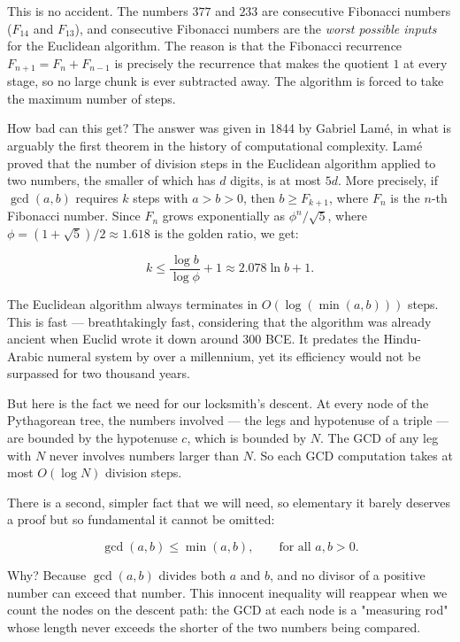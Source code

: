 This is no accident. The numbers $377$ and $233$ are consecutive Fibonacci numbers ($F_{14}$ and $F_{13}$), and consecutive Fibonacci numbers are the \textit{worst possible inputs} for the Euclidean algorithm. The reason is that the Fibonacci recurrence $F_{n+1} = F_n + F_{n-1}$ is precisely the recurrence that makes the quotient $1$ at every stage, so no large chunk is ever subtracted away. The algorithm is forced to take the maximum number of steps.

How bad can this get? The answer was given in 1844 by Gabriel Lamé, in what is arguably the first theorem in the history of computational complexity. Lamé proved that the number of division steps in the Euclidean algorithm applied to two numbers, the smaller of which has $d$ digits, is at most $5d$. More precisely, if $\gcd(a, b)$ requires $k$ steps with $a > b > 0$, then $b \ge F_{k+1}$, where $F_n$ is the $n$-th Fibonacci number. Since $F_n$ grows exponentially as $\phi^n / \sqrt{5}$, where $\phi = (1 + \sqrt{5})/2 \approx 1.618$ is the golden ratio, we get:

\[
k \le \frac{\log b}{\log \phi} + 1 \approx 2.078 \ln b + 1.
\]

The Euclidean algorithm always terminates in $O(\log(\min(a, b)))$ steps. This is fast --- breathtakingly fast, considering that the algorithm was already ancient when Euclid wrote it down around 300 BCE. It predates the Hindu-Arabic numeral system by over a millennium, yet its efficiency would not be surpassed for two thousand years.

But here is the fact we need for our locksmith's descent. At every node of the Pythagorean tree, the numbers involved --- the legs and hypotenuse of a triple --- are bounded by the hypotenuse $c$, which is bounded by $N$. The GCD of any leg with $N$ never involves numbers larger than $N$. So each GCD computation takes at most $O(\log N)$ division steps.

There is a second, simpler fact that we will need, so elementary it barely deserves a proof but so fundamental it cannot be omitted:

\[
\gcd(a, b) \le \min(a, b), \qquad \text{for all } a, b > 0.
\]

Why? Because $\gcd(a, b)$ divides both $a$ and $b$, and no divisor of a positive number can exceed that number. This innocent inequality will reappear when we count the nodes on the descent path: the GCD at each node is a "measuring rod" whose length never exceeds the shorter of the two numbers being compared.

